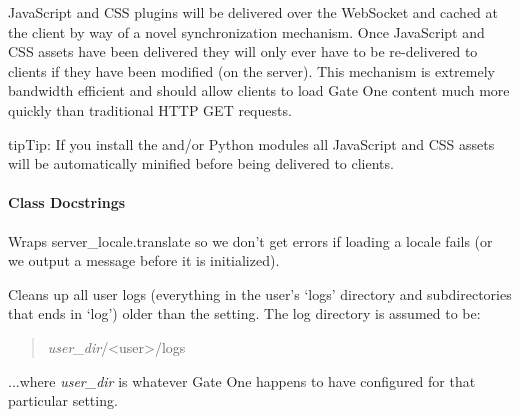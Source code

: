 \documentclass[letterpaper,10pt,openany]{sphinxmanual}
\begin{document}
JavaScript and CSS plugins will be delivered over the WebSocket and cached at
the client by way of a novel synchronization mechanism.  Once JavaScript and CSS
assets have been delivered they will only ever have to be re-delivered to
clients if they have been modified (on the server).  This mechanism is extremely
bandwidth efficient and should allow clients to load Gate One content much more
quickly than traditional HTTP GET requests.

\begin{notice}{tip}{Tip:}
If you install the  and/or  Python modules all JavaScript
and CSS assets will be automatically minified before being delivered to
clients.
\end{notice}


\paragraph{Class Docstrings}
\label{Developer/server:class-docstrings}

\begin{fulllineitems}
\label{Developer/server:gateone.core.server._}
Wraps server\_locale.translate so we don't get errors if loading a locale
fails (or we output a message before it is initialized).

\end{fulllineitems}


\begin{fulllineitems}
\label{Developer/server:gateone.core.server.cleanup_user_logs}
Cleans up all user logs (everything in the user's `logs' directory and
subdirectories that ends in `log') older than the 
setting.  The log directory is assumed to be:
\begin{quote}

\emph{user\_dir}/\textless{}user\textgreater{}/logs
\end{quote}

...where \emph{user\_dir} is whatever Gate One happens to have configured for
that particular setting.

\end{fulllineitems}
\end{document}
